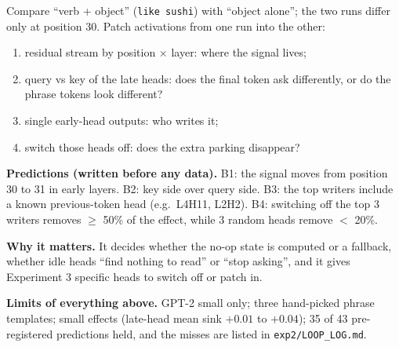 \documentclass[10pt]{article}
\begin{document}
\begin{center}
\begin{minipage}[c]{0.4\linewidth}
\end{minipage}\hfill
\begin{minipage}[c]{0.56\linewidth}
\small
Compare ``verb + object'' (\texttt{like sushi}) with ``object alone''; the two runs differ only at position 30. Patch activations from one run into the other:
\begin{enumerate}
  \item residual stream by position $\times$ layer: where the signal lives;
  \item query vs key of the late heads: does the final token ask differently, or do the phrase tokens look different?
  \item single early-head outputs: who writes it;
  \item switch those heads off: does the extra parking disappear?
\end{enumerate}
\textbf{Predictions (written before any data).} B1: the signal moves from position 30 to 31 in early layers. B2: key side over query side. B3: the top writers include a known previous-token head (e.g.\ L4H11, L2H2). B4: switching off the top 3 writers removes $\ge$ 50\% of the effect, while 3 random heads remove $<$ 20\%.
\end{minipage}
\end{center}

\textbf{Why it matters.} It decides whether the no-op state is computed or a fallback, whether idle heads ``find nothing to read'' or ``stop asking'', and it gives Experiment 3 specific heads to switch off or patch in.

\textbf{Limits of everything above.} GPT-2 small only; three hand-picked phrase templates; small effects (late-head mean sink $+0.01$ to $+0.04$); 35 of 43 pre-registered predictions held, and the misses are listed in \texttt{exp2/LOOP\_LOG.md}.
\end{document}
